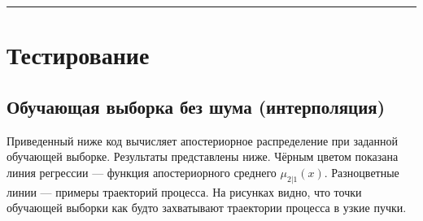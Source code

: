 \documentclass[11pt,a4paper]{article}
\begin{document}
    \begin{center}\rule{0.5\linewidth}{0.5pt}\end{center}

    \hypertarget{ux442ux435ux441ux442ux438ux440ux43eux432ux430ux43dux438ux435}{%
\section{Тестирование}\label{ux442ux435ux441ux442ux438ux440ux43eux432ux430ux43dux438ux435}}

    \hypertarget{ux43eux431ux443ux447ux430ux44eux449ux430ux44f-ux432ux44bux431ux43eux440ux43aux430-ux431ux435ux437-ux448ux443ux43cux430-ux438ux43dux442ux435ux440ux43fux43eux43bux44fux446ux438ux44f}{%
\subsection{Обучающая выборка без шума
(интерполяция)}\label{ux43eux431ux443ux447ux430ux44eux449ux430ux44f-ux432ux44bux431ux43eux440ux43aux430-ux431ux435ux437-ux448ux443ux43cux430-ux438ux43dux442ux435ux440ux43fux43eux43bux44fux446ux438ux44f}}

Приведенный ниже код вычисляет апостериорное распределение при заданной
обучающей выборке. Результаты представлены ниже. Чёрным цветом показана
линия регрессии --- функция апостериорного среднего \(\mu_{2|1}(x)\).
Разноцветные линии --- примеры траекторий процесса. На рисунках видно,
что точки обучающей выборки как будто захватывают траектории процесса в
узкие пучки.
\end{document}
